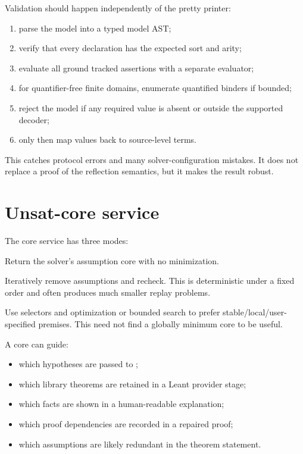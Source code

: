 \documentclass[11pt,letterpaper,openany]{report}
\newcommand{\code}[1]{\texttt{\detokenize{#1}}}
\begin{document}
Validation should happen independently of the pretty printer:

\begin{enumerate}
  \item parse the model into a typed model AST;
  \item verify that every declaration has the expected sort and arity;
  \item evaluate all ground tracked assertions with a separate evaluator;
  \item for quantifier-free finite domains, enumerate quantified binders if bounded;
  \item reject the model if any required value is absent or outside the supported
        decoder;
  \item only then map values back to source-level terms.
\end{enumerate}

This catches protocol errors and many solver-configuration mistakes. It does not
replace a proof of the reflection semantics, but it makes the result robust.

\section{Unsat-core service}

The core service has three modes:

\begin{description}[style=nextline,leftmargin=1.8em]
  \item[Fast core] Return the solver's assumption core with no minimization.
  \item[Deletion-minimized core] Iteratively remove assumptions and recheck. This is
        deterministic under a fixed order and often produces much smaller replay
        problems.
  \item[Weighted core] Use selectors and optimization or bounded search to prefer
        stable/local/user-specified premises. This need not find a globally minimum
        core to be useful.
\end{description}

A core can guide:

\begin{itemize}
  \item which hypotheses are passed to \code{grind};
  \item which library theorems are retained in a Leant provider stage;
  \item which facts are shown in a human-readable explanation;
  \item which proof dependencies are recorded in a repaired proof;
  \item which assumptions are likely redundant in the theorem statement.
\end{itemize}
\end{document}
